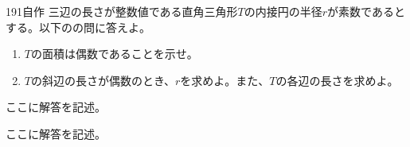 \begin{thm}{191}{}{自作}
 三辺の長さが整数値である直角三角形$T$の内接円の半径$r$が素数であるとする。以下のの問に答えよ。
 \begin{enumerate}
  \item $T$の面積は偶数であることを示せ。
  \item $T$の斜辺の長さが偶数のとき、$r$を求めよ。また、$T$の各辺の長さを求めよ。
 \end{enumerate}
\end{thm}

ここに解答を記述。

ここに解答を記述。